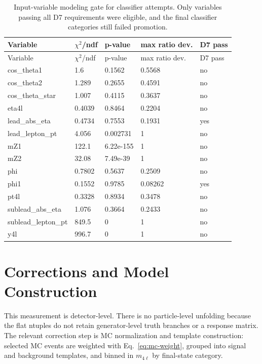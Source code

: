 \documentclass[11pt]{article}
\begin{document}
\begin{longtable}{lllll}
\caption{Input-variable modeling gate for classifier attempts. Only variables passing all D7 requirements were eligible, and the final classifier categories still failed promotion.}\label{tab:input-gate}\\
\toprule
Variable & $\chi^2$/ndf & p-value & max ratio dev. & D7 pass \\ 
\midrule
\endfirsthead
\toprule
Variable & $\chi^2$/ndf & p-value & max ratio dev. & D7 pass \\ 
\midrule
\endhead
cos\_theta1 & 1.6 & 0.1562 & 0.5568 & no \\
cos\_theta2 & 1.289 & 0.2655 & 0.4591 & no \\
cos\_theta\_star & 1.007 & 0.4115 & 0.3637 & no \\
eta4l & 0.4039 & 0.8464 & 0.2204 & no \\
lead\_abs\_eta & 0.4734 & 0.7553 & 0.1931 & yes \\
lead\_lepton\_pt & 4.056 & 0.002731 & 1 & no \\
mZ1 & 122.1 & 6.22e-155 & 1 & no \\
mZ2 & 32.08 & 7.49e-39 & 1 & no \\
phi & 0.7802 & 0.5637 & 0.2509 & no \\
phi1 & 0.1552 & 0.9785 & 0.08262 & yes \\
pt4l & 0.3328 & 0.8934 & 0.3478 & no \\
sublead\_abs\_eta & 1.076 & 0.3664 & 0.2433 & no \\
sublead\_lepton\_pt & 849.5 & 0 & 1 & no \\
y4l & 996.7 & 0 & 1 & no \\
\bottomrule
\end{longtable}


\section{Corrections and Model Construction}
This measurement is detector-level. There is no particle-level unfolding because the flat ntuples do not retain generator-level truth branches or a response matrix. The relevant correction step is MC normalization and template construction: selected MC events are weighted with Eq.~\ref{eq:mc-weight}, grouped into signal and background templates, and binned in $m_{4\ell}$ by final-state category.
\end{document}
